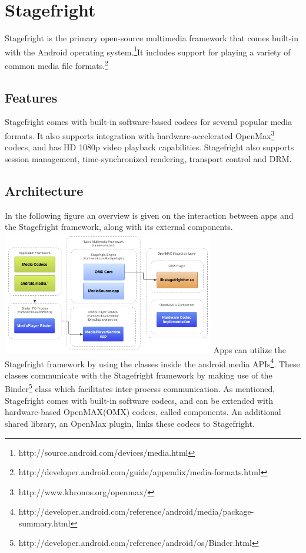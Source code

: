 \section{Stagefright}
Stagefright is the primary open-source multimedia framework that comes built-in with the Android operating system.\footnote{http://source.android.com/devices/media.html}It includes support for playing a variety of common media file formats.\footnote{http://developer.android.com/guide/appendix/media-formats.html}
\subsection{Features}
Stagefright comes with built-in software-based codecs for several popular media formats. It also supports integration with hardware-accelerated OpenMax\footnote{http://www.khronos.org/openmax/} codecs, and has HD 1080p video playback capabilities. Stagefright also supports session management, time-synchronized rendering, transport control and DRM.
\subsection{Architecture}
In the following figure an overview is given on the interaction between apps and the Stagefright framework, along with its external components.\\
\includegraphics[width=350px]{video_decoding/native.png}
Apps can utilize the Stagefright framework by using the classes inside the android.media APIs\footnote{http://developer.android.com/reference/android/media/package-summary.html}. These classes communicate with the Stagefright framework by making use of the Binder\footnote{http://developer.android.com/reference/android/os/Binder.html} class which facilitates inter-process communication. As mentioned, Stagefright comes with built-in software codecs, and can be extended with hardware-based OpenMAX(OMX) codecs, called components. An additional shared library, an OpenMax plugin, links these codecs to Stagefright.
